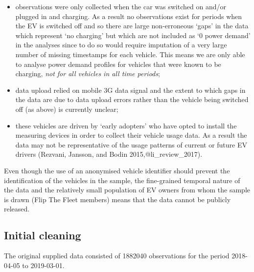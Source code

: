\documentclass[]{article}
\providecommand{\tightlist}{%
  \setlength{\itemsep}{0pt}\setlength{\parskip}{0pt}}
\begin{document}
\begin{itemize}
\tightlist
\item
  observations were only collected when the car was switched on and/or plugged in and charging. As a result no observations exist for periods when the EV is switched off and so there are large non-erroneous `gaps' in the data which represent `no charging' but which are not included as `0 power demand' in the analyses since to do so would require imputation of a very large number of missing timestamps for each vehicle. This means we are only able to analyse power demand profiles for vehicles that were known to be charging, \emph{not for all vehicles in all time periods};
\item
  data upload relied on mobile 3G data signal and the extent to which gaps in the data are due to data upload errors rather than the vehicle being switched off (as above) is currently unclear;
\item
  these vehicles are driven by `early adopters' who have opted to install the measuring devices in order to collect their vehicle usage data. As a result the data may not be representative of the usage patterns of current or future EV drivers (Rezvani, Jansson, and Bodin 2015,@li\_review\_2017).
\end{itemize}

Even though the use of an anonymised vehicle identifier should prevent the identification of the vehicles in the sample, the fine-grained temporal nature of the data and the relatively small population of EV owners from whom the sample is drawn (Flip The Fleet members) means that the data cannot be publicly released.

\hypertarget{cleaning}{%
\subsection{Initial cleaning}\label{cleaning}}

The original supplied data consisted of 1882040 observations for the period 2018-04-05 to 2019-03-01.
\end{document}
